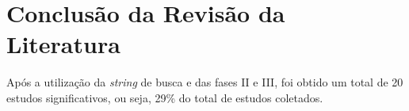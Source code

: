 \section{Conclusão da Revisão da Literatura}
\quad Após a utilização da \textit{string} de busca e das fases II e III, foi obtido um total de 20 estudos significativos,
ou seja, 29\% do total de estudos coletados.




